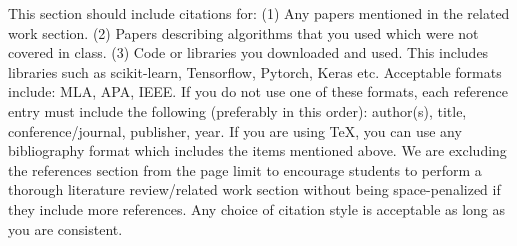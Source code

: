 \documentclass{article}
\begin{document}
This section should include citations for: (1) Any papers mentioned in the related work
section. (2) Papers describing algorithms that you used which were not covered in class.
(3) Code or libraries you downloaded and used. This includes libraries such as scikit-learn, Tensorflow, Pytorch, Keras etc. Acceptable formats include: MLA, APA, IEEE. If you
do not use one of these formats, each reference entry must include the following (preferably
in this order): author(s), title, conference/journal, publisher, year. If you are using TeX,
you can use any bibliography format which includes the items mentioned above. We are excluding
the references section from the page limit to encourage students to perform a thorough
literature review/related work section without being space-penalized if they include more
references. Any choice of citation style is acceptable
as long as you are consistent. 

\medskip




\end{document}
